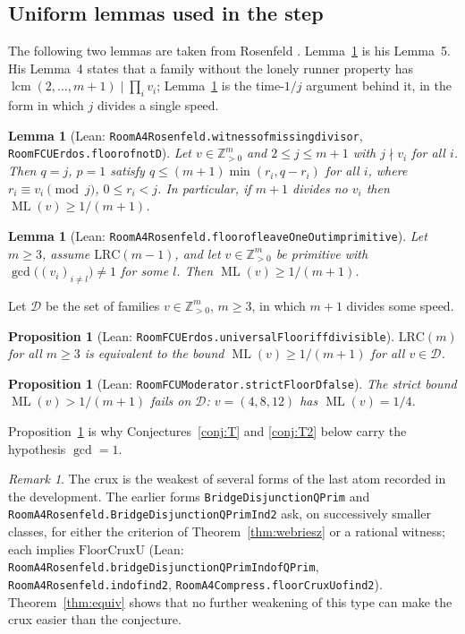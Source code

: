 \documentclass[11pt]{amsart}
\theoremstyle{plain}
\newtheorem{proposition}[theorem]{Proposition}
\newtheorem{lemma}[theorem]{Lemma}
\theoremstyle{definition}
\theoremstyle{remark}
\newtheorem{remark}[theorem]{Remark}
\newcommand{\ML}{\operatorname{ML}}
\newcommand{\Z}{\mathbb{Z}}
\newcommand{\lean}[1]{{\def\_{\textunderscore\allowbreak}\def\.{.\allowbreak}\texttt{#1}}}
\newcommand{\LRC}{\mathrm{LRC}}
\begin{document}
\subsection{Uniform lemmas used in the step}
The following two lemmas are taken from Rosenfeld \cite{ros8}. Lemma~\ref{lem:ros5} is his
Lemma~5. His Lemma~4 states that a family without the lonely runner property has
$\operatorname{lcm}(2,\dots,m+1)\mid\prod_iv_i$; Lemma~\ref{lem:ros4} is the time-$1/j$ argument
behind it, in the form in which $j$ divides a single speed.

\begin{lemma}[Lean: \lean{RoomA4Rosenfeld\.witness\_of\_missing\_divisor}, \lean{RoomFCUErdos\.floor\_of\_not\_D}]\label{lem:ros4}
Let $v\in\Z_{>0}^m$ and $2\le j\le m+1$ with $j\nmid v_i$ for all $i$. Then
$q=j$, $p=1$ satisfy $q\le(m+1)\min(r_i,q-r_i)$ for all $i$, where $r_i\equiv v_i\pmod j$,
$0\le r_i<j$. In particular, if $m+1$ divides no $v_i$ then $\ML(v)\ge1/(m+1)$.
\end{lemma}

\begin{lemma}[Lean: \lean{RoomA4Rosenfeld\.floor\_of\_leaveOneOut\_imprimitive}]\label{lem:ros5}
Let $m\ge 3$, assume $\LRC(m-1)$, and let $v\in\Z_{>0}^m$ be primitive with
$\gcd\big((v_i)_{i\ne l}\big)\ne1$ for some $l$. Then $\ML(v)\ge1/(m+1)$.
\end{lemma}

Let $\mathcal D$ be the set of families $v\in\Z_{>0}^m$, $m\ge 3$, in which $m+1$ divides some
speed.

\begin{proposition}[Lean: \lean{RoomFCUErdos\.universalFloor\_iff\_divisible}]\label{prop:D}
$\LRC(m)$ for all $m\ge3$ is equivalent to the bound $\ML(v)\ge1/(m+1)$ for all $v\in\mathcal D$.
\end{proposition}

\begin{proposition}[Lean: \lean{RoomFCUModerator\.strictFloorD\_false}]\label{prop:strictD}
The strict bound $\ML(v)>1/(m+1)$ fails on $\mathcal D$: $v=(4,8,12)$ has $\ML(v)=1/4$.
\end{proposition}

Proposition~\ref{prop:strictD} is why Conjectures~\ref{conj:T} and \ref{conj:T2} below carry the
hypothesis $\gcd=1$.

\begin{remark}
The crux is the weakest of several forms of the last atom recorded in the development. The
earlier forms \lean{BridgeDisjunctionQPrim} and \lean{RoomA4Rosenfeld\.BridgeDisjunctionQPrimInd2}
ask, on successively smaller classes, for either the criterion of Theorem~\ref{thm:webriesz} or
a rational witness; each implies $\mathrm{FloorCruxU}$ (Lean:
\lean{RoomA4Rosenfeld\.bridgeDisjunctionQPrimInd\_of\_QPrim}, \lean{RoomA4Rosenfeld\.ind\_of\_ind2},
\lean{RoomA4Compress\.floorCruxU\_of\_ind2}). Theorem~\ref{thm:equiv} shows that no further
weakening of this type can make the crux easier than the conjecture.
\end{remark}
\end{document}
